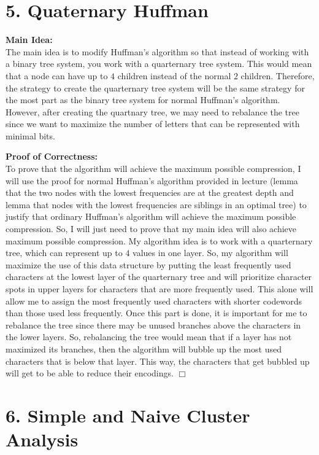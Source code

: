 \documentclass[11pt]{article}
\def\endproofmark{$\Box$}
\newenvironment{mainIdea}{\par{\bf Main Idea:}}{\smallskip}
\newenvironment{proofOfCorrectness}{\par{\bf Proof of Correctness:}}{\endproofmark\smallskip}
\begin{document}
\section*{5. Quaternary Huffman}
\begin{mainIdea}
\\
The main idea is to modify Huffman's algorithm so that instead of working with a binary tree system, you work with a quarternary tree system. This would mean that a node can have up to $4$ children instead of the normal $2$ children. Therefore, the strategy to create the quarternary tree system will be the same strategy for the most part as the binary tree system for normal Huffman's algorithm. However, after creating the quartnary tree, we may need to rebalance the tree since we want to maximize the number of letters that can be represented with minimal bits.
\end{mainIdea}
\\
\begin{proofOfCorrectness}
\\
To prove that the algorithm will achieve the maximum possible compression, I will use the proof for normal Huffman's algorithm provided in lecture (lemma that the two nodes with the lowest frequencies are at the greatest depth and lemma that nodes with the lowest frequencies are siblings in an optimal tree) to justify that ordinary Huffman's algorithm will achieve the maximum possible compression. So, I will just need to prove that my main idea will also achieve maximum possible compression. My algorithm idea is to work with a quarternary tree, which can represent up to $4$ values in one layer. So, my algorithm will maximize the use of this data structure by putting the least frequently used characters at the lowest layer of the quarternary tree and will prioritize character spots in upper layers for characters that are more frequently used. This alone will allow me to assign the most frequently used characters with shorter codewords than those used less frequently. Once this part is done, it is important for me to rebalance the tree since there may be unused branches above the characters in the lower layers. So, rebalancing the tree would mean that if a layer has not maximized its branches, then the algorithm will bubble up the most used characters that is below that layer. This way, the characters that get bubbled up will get to be able to reduce their encodings. 
\end{proofOfCorrectness}



\newpage
\section*{6. Simple and Naive Cluster Analysis}
\end{document}
